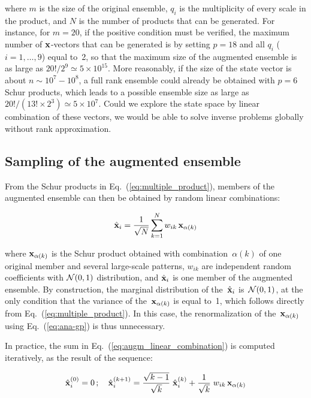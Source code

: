 \documentclass[11pt]{article}
\begin{document}
\noindent
where $m$ is the size of the original ensemble,
$q_i$ is the multiplicity of every scale in the product, and
$N$ is the number of products that can be generated.
For instance, for $m=20$, if the positive condition must be verified,
the maximum number of ${\bf x}$-vectors that can be generated is
by setting $p=18$ and all $q_i$ ($i=1,\ldots,9$) equal to~2,
so that the maximum size of the augmented ensemble is
as large as $20!/2^9 \simeq 5 \times 10^{15}$.
More reasonably, if the size of the state vector is about $n\sim 10^7 - 10^8$,
a full rank ensemble could already be obtained with $p=6$ Schur products,
which leads to a possible ensemble size
as large as $20!/(13!\times 2^3) \simeq 5 \times 10^{7}$.
Could we explore the state space by linear combination of these vectors,
we would be able to solve inverse problems globally without rank approximation.

\subsection{Sampling of the augmented ensemble}

From the Schur products in Eq.~(\ref{eq:multiple_product}), members of the augmented ensemble
can then be obtained by random linear combinations:

\begin{equation}
\label{eq:augm_linear_combination}
\hat{\bf x}_i = \frac{1}{\sqrt{N}} \sum_{k=1}^{N} w_{ik} \, {\bf x}_{\alpha(k)}
\end{equation}

\noindent
where ${\bf x}_{\alpha(k)}$ is the Schur product obtained with combination~$\alpha(k)$
of one original member and several large-scale patterns,
$w_{ik}$ are independent random coefficients with ${\cal N}(0,1)$ distribution,
and $\hat{\bf x}_i$ is one member of the augmented ensemble.
By construction, the marginal distribution of the~$\hat{\bf x}_i$ is~${\cal N}(0,1)$,
at the only condition that the variance of the~${\bf x}_{\alpha(k)}$ is equal to~1,
which follows directly from Eq.~(\ref{eq:multiple_product}).
In this case, the renormalization of the~${\bf x}_{\alpha(k)}$
using Eq.~(\ref{eq:ana-gp}) is thus unnecessary.

In practice, the sum in Eq.~(\ref{eq:augm_linear_combination}) is computed iteratively,
as the result of the sequence:

\begin{equation}
\label{eq:augm_chain}
\hat{\bf x}_i^{(0)} = 0 \, ; \quad
\hat{\bf x}_i^{(k+1)} = \frac{\sqrt{k-1}}{\sqrt{k}} \; \hat{\bf x}_i^{(k)}
                      + \frac{1}{\sqrt{k}} \; w_{ik} \, {\bf x}_{\alpha(k)}
\end{equation}
\end{document}
